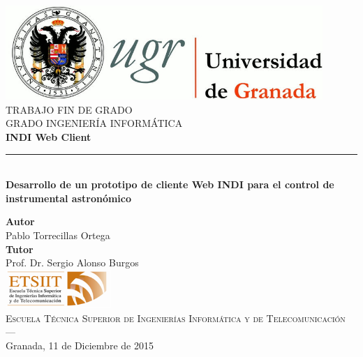 \begin{titlepage}


\newlength{\centeroffset}
\setlength{\centeroffset}{-0.5\oddsidemargin}
\addtolength{\centeroffset}{0.5\evensidemargin}
\thispagestyle{empty}

\noindent\hspace*{\centeroffset}\begin{minipage}{\textwidth}

\centering
\includegraphics[width=0.9\textwidth]{imagenes/logo_ugr.jpg}\\[1.4cm]

\textsc{ \Large TRABAJO FIN DE GRADO\\[0.2cm]}
\textsc{ GRADO INGENIERÍA INFORMÁTICA}\\[1cm]
%
{\Huge\bfseries INDI Web Client\\
}
\noindent\rule[-1ex]{\textwidth}{3pt}\\[3.5ex]
{\large\bfseries Desarrollo de un prototipo de cliente Web INDI para el control de instrumental astronómico}
\end{minipage}

\vspace{2.5cm}
\noindent\hspace*{\centeroffset}\begin{minipage}{\textwidth}
\centering

\textbf{Autor}\\ {Pablo Torrecillas Ortega}\\[2.5ex]
\textbf{Tutor}\\
{Prof. Dr. Sergio Alonso Burgos}\\[2cm]
\includegraphics[width=0.3\textwidth]{imagenes/etsiit_logo.png}\\[0.1cm]
\textsc{Escuela Técnica Superior de Ingenierías Informática y de Telecomunicación}\\
\textsc{---}\\
Granada, 11 de Diciembre de 2015
\end{minipage}
\end{titlepage}
